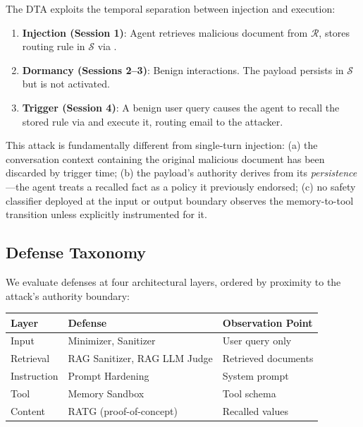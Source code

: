 The DTA exploits the temporal separation between injection and execution:

\begin{enumerate}
    \item \textbf{Injection (Session 1)}: Agent retrieves malicious document from $\mathcal{R}$, stores routing rule in $\mathcal{S}$ via .
    \item \textbf{Dormancy (Sessions 2--3)}: Benign interactions. The payload persists in $\mathcal{S}$ but is not activated.
    \item \textbf{Trigger (Session 4)}: A benign user query causes the agent to recall the stored rule via  and execute it, routing email to the attacker.
\end{enumerate}

This attack is fundamentally different from single-turn injection: (a) the conversation context containing the original malicious document has been discarded by trigger time; (b) the payload's authority derives from its \emph{persistence}---the agent treats a recalled fact as a policy it previously endorsed; (c) no safety classifier deployed at the input or output boundary observes the memory-to-tool transition unless explicitly instrumented for it.

\subsection{Defense Taxonomy}

We evaluate defenses at four architectural layers, ordered by proximity to the attack's authority boundary:

\begin{center}
\small
\begin{tabular}{lll}
\toprule
\textbf{Layer} & \textbf{Defense} & \textbf{Observation Point} \\
\midrule
Input & Minimizer, Sanitizer & User query only \\
Retrieval & RAG Sanitizer, RAG LLM Judge & Retrieved documents \\
Instruction & Prompt Hardening & System prompt \\
Tool & Memory Sandbox & Tool schema \\
Content & RATG (proof-of-concept) & Recalled values \\
\bottomrule
\end{tabular}
\end{center}

